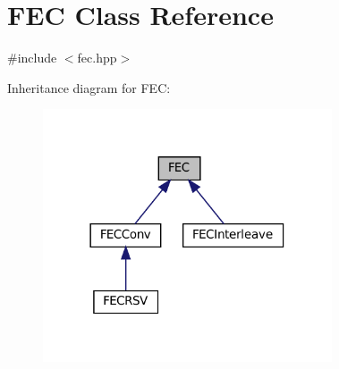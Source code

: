 \hypertarget{classFEC}{}\section{F\+EC Class Reference}
\label{classFEC}


{\ttfamily \#include $<$fec.\+hpp$>$}



Inheritance diagram for F\+EC\+:\nopagebreak
\begin{figure}[H]
\begin{center}
\leavevmode
\includegraphics[width=242pt]{classFEC__inherit__graph}
\end{center}
\end{figure}
